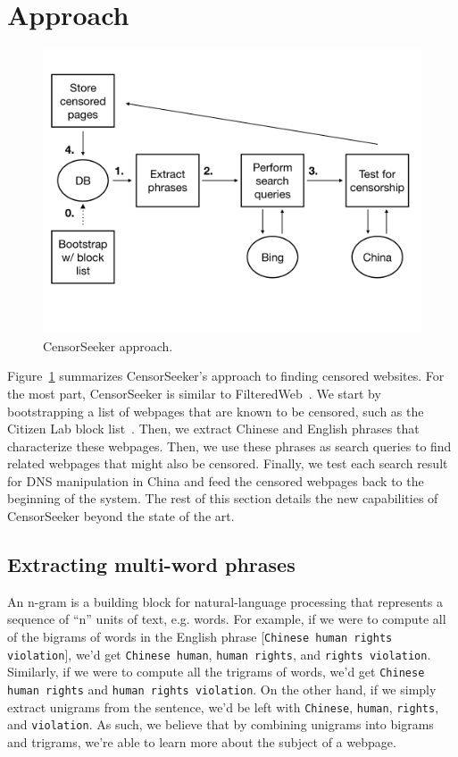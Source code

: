 \section{Approach}

\begin{figure}[t]
  \centering
  \includegraphics[scale=0.23]{figures/arch-2}
  \caption{\label{arch}CensorSeeker approach.}
\end{figure}

Figure~\ref{arch} summarizes CensorSeeker's approach to finding censored
websites. For the most part, CensorSeeker is similar to
FilteredWeb~\cite{darer2017filteredweb}. We start by bootstrapping a list of
webpages that are known to be censored, such as the Citizen Lab block
list~\cite{citizenlab:block}.
Then, we extract Chinese and English phrases that characterize these webpages.
Then, we use these phrases as search queries to find related webpages that
might also be censored. Finally, we test each search result for DNS
manipulation in China and feed the censored webpages back to the beginning of
the system. The rest of this section details the new capabilities of
CensorSeeker beyond the state of the art.

\subsection{Extracting multi-word phrases}
An n-gram is a building block for natural-language processing that
represents a sequence of ``n'' units of text, e.g. words. For example,
if we were to compute all of the bigrams of words in the English phrase
[\texttt{Chinese human rights violation}], we'd get \texttt{Chinese
human}, \texttt{human rights}, and \texttt{rights violation}. Similarly,
if we were to compute all the trigrams of words, we'd get
\texttt{Chinese human rights} and \texttt{human rights violation}. On the
other hand, if we simply extract unigrams from the sentence,
we'd be left with \texttt{Chinese}, \texttt{human}, \texttt{rights}, and
\texttt{violation}. As such, we believe that by combining unigrams
into bigrams and trigrams, we're able to learn more about the subject
of a webpage.

